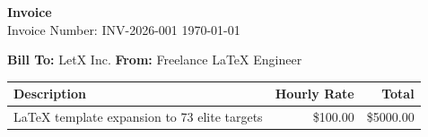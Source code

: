 \documentclass[11pt,a4paper]{article}
\begin{document}
\begin{center}
    {\huge \bfseries Invoice} \\
    \vspace{0.2cm}
    Invoice Number: INV-2026-001 \hfill \today
\end{center}

\vspace{1cm}
\noindent
\textbf{Bill To:} LetX Inc. \hfill \textbf{From:} Freelance LaTeX Engineer

\vspace{1cm}
\begin{tabularx}{\textwidth}{X r r}
    \toprule
    Description & Hourly Rate & Total \\
    \midrule
    LaTeX template expansion to 73 elite targets & \$100.00 & \$5000.00 \\
    \bottomrule
\end{tabularx}
\end{document}
